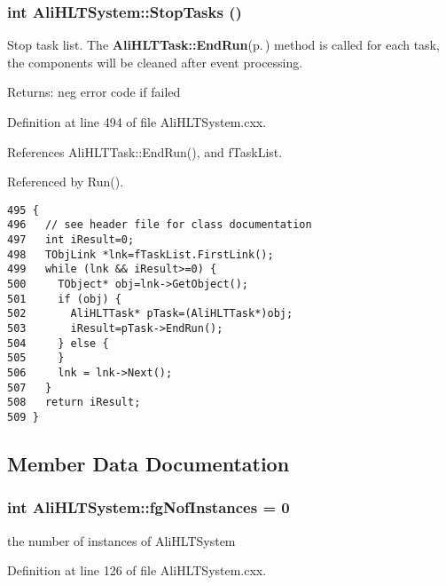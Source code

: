 \subsubsection{\setlength{\rightskip}{0pt plus 5cm}int Ali\-HLTSystem::Stop\-Tasks ()}\label{classAliHLTSystem_a18}


Stop task list. The {\bf Ali\-HLTTask::End\-Run}{\rm (p.\,\pageref{classAliHLTTask_a19})} method is called for each task, the components will be cleaned after event processing. \begin{Desc}
\item[Returns:]neg error code if failed \end{Desc}


Definition at line 494 of file Ali\-HLTSystem.cxx.

References Ali\-HLTTask::End\-Run(), and f\-Task\-List.

Referenced by Run().

\footnotesize\begin{verbatim}495 {
496   // see header file for class documentation
497   int iResult=0;
498   TObjLink *lnk=fTaskList.FirstLink();
499   while (lnk && iResult>=0) {
500     TObject* obj=lnk->GetObject();
501     if (obj) {
502       AliHLTTask* pTask=(AliHLTTask*)obj;
503       iResult=pTask->EndRun();
504     } else {
505     }
506     lnk = lnk->Next();
507   }
508   return iResult;
509 }
\end{verbatim}\normalsize 




\subsection{Member Data Documentation}
\subsubsection{\setlength{\rightskip}{0pt plus 5cm}int {\bf Ali\-HLTSystem::fg\-Nof\-Instances} = 0\hspace{0.3cm}{\tt  [static, private]}}\label{classAliHLTSystem_v0}


the number of instances of Ali\-HLTSystem 

Definition at line 126 of file Ali\-HLTSystem.cxx.

